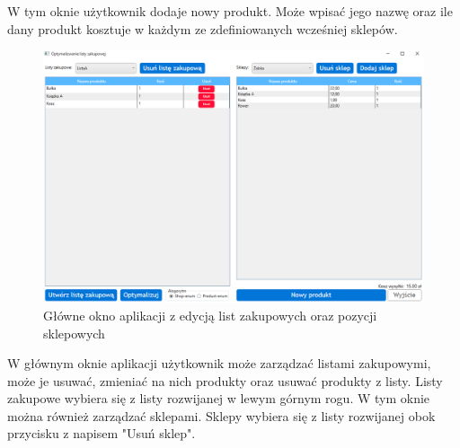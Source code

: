 \documentclass[a4paper]{article}
\begin{document}
\begin{flushleft}
W tym oknie użytkownik dodaje nowy produkt. Może wpisać jego nazwę oraz ile dany produkt kosztuje w każdym ze zdefiniowanych wcześniej sklepów.
\end{flushleft}
\begin{figure}[H]
\centering
\includegraphics[width=\textwidth,keepaspectratio]{img/main.png}
\caption{Główne okno aplikacji z edycją list zakupowych oraz pozycji sklepowych}
\end{figure}
\begin{flushleft}
W głównym oknie aplikacji użytkownik może zarządzać listami zakupowymi, może je usuwać, zmieniać na nich produkty oraz usuwać produkty z listy. Listy zakupowe wybiera się z listy rozwijanej w lewym górnym rogu. W tym oknie można również zarządzać sklepami. Sklepy wybiera się z listy rozwijanej obok przycisku z napisem "Usuń sklep".
\end{flushleft}
\end{document}
